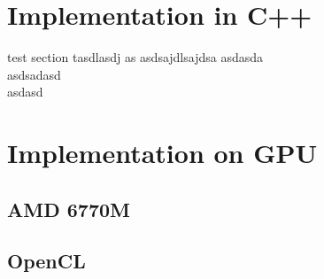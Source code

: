 \section{Implementation in C++}

test section tasdlasdj as
asdsajdlsajdsa
asdasda\\
asdsadasd\\
asdasd\\
\section{Implementation on GPU }

\subsection{AMD 6770M}
 
\subsection{OpenCL}


